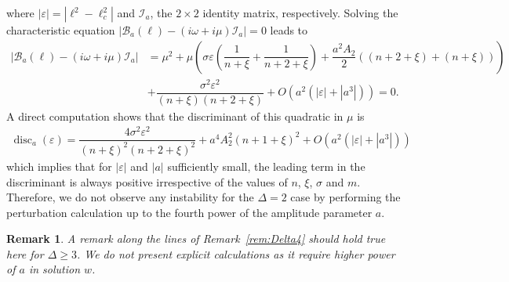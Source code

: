 \documentclass[12pt]{amsart}    %
\renewcommand{\geq}{\geqslant}
\renewcommand{\leq}{\leqslant}
\newtheorem{remark}[theorem]{Remark}
\numberwithin{equation}{section}
\begin{document}
where $|\varepsilon|=|\ell^2-\ell_c^2|$ and $\mathcal{I}_a$, the $2\times 2$ identity matrix, respectively.
Solving the characteristic equation $|\mathcal{B}_{a}(\ell)-(i \omega + i \mu) \mathcal{I}_{a}| = 0$ leads to
\begin{align*}
   |\mathcal{B}_{a}(\ell)-(i \omega + i \mu) \mathcal{I}_{a}|& = \mu^2  + \mu \left(\sigma \varepsilon \left(\dfrac{1}{n+\xi}+\dfrac{1}{n+2+\xi}\right)+\dfrac{a^2A_2}{2}((n+2+\xi)+(n+\xi))\right)\\&+\dfrac{\sigma^2 \varepsilon^2}{(n+\xi)(n+2+\xi)}+O(a^2(|\varepsilon|+|a^3|))=0.
\end{align*}
A direct computation shows that the discriminant of this quadratic in $\mu$ is
\begin{align*}
    \operatorname{disc}_a(\varepsilon) = \dfrac{4\sigma^2 \varepsilon^2}{(n+\xi)^2(n+2+\xi)^2}+a^4A_2^2(n+1+\xi)^2+O(a^2(|\varepsilon|+|a^3|))
\end{align*}
which implies that for $|\varepsilon|$  and $|a|$ sufficiently small, the leading term in the discriminant is always positive irrespective of the values of $n$, $\xi$, $\sigma$ and $m$. Therefore, we do not observe any instability for the $\Delta =2$ case by performing the perturbation calculation up to the fourth power of the amplitude parameter $a$. 
\begin{remark}
A remark along the lines of Remark~\ref{rem:Delta4} should hold true here for $\Delta\geq 3$. We do not present explicit calculations as it require higher power of $a$ in solution $w$.
\end{remark}

\end{document}
